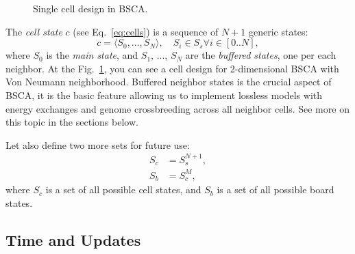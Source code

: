 \documentclass[a4paper,12pt,tikz,UTF8]{article}
\begin{document}
    \begin{figure}[h]
      \centering
      \caption{Single cell design in BSCA.}
      \label{fig:cell-design}
    \end{figure}

    The \textit{cell state} $c$ (see Eq.~\ref{eq:cells}) is a sequence of $N + 1$ generic states:
    \begin{equation}
      \label{eq:cell-state}
      c = \langle S_0, ..., S_N \rangle, \quad S_i \in S_s \forall i \in {[0 .. N]},
    \end{equation}
    where $S_0$ is the \textit{main state}, and $S_1$, ..., $S_N$ are the \textit{buffered states}, one per each neighbor. At the Fig.~\ref{fig:cell-design}, you can see a cell design for 2-dimensional BSCA with Von Neumann neighborhood. Buffered neighbor states is the crucial aspect of BSCA, it is the basic feature allowing us to implement lossless models with energy exchanges and genome crossbreeding across all neighbor cells. See more on this topic in the sections below.

    Let also define two more sets for future use:
    \begin{align}
      S_c &= S_s^{N + 1},\\
      S_b &= S_c^M,
    \end{align}
    where $S_c$ is a set of all possible cell states, and $S_b$ is a set of all possible board states.

  \subsection{Time and Updates}
\end{document}
